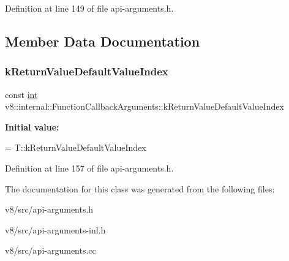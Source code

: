 Definition at line 149 of file api-\/arguments.\+h.



\subsection{Member Data Documentation}
\mbox{\label{classv8_1_1internal_1_1FunctionCallbackArguments_acea5b4f12674359f9dcfd43ab6be7795}} 
\subsubsection{\texorpdfstring{k\+Return\+Value\+Default\+Value\+Index}{kReturnValueDefaultValueIndex}}
{\footnotesize\ttfamily const \mbox{\hyperlink{classint}{int}} v8\+::internal\+::\+Function\+Callback\+Arguments\+::k\+Return\+Value\+Default\+Value\+Index\hspace{0.3cm}{\ttfamily [static]}}

{\bfseries Initial value\+:}
\begin{DoxyCode}
=
      T::kReturnValueDefaultValueIndex
\end{DoxyCode}


Definition at line 157 of file api-\/arguments.\+h.



The documentation for this class was generated from the following files\+:\begin{DoxyCompactItemize}
\item 
v8/src/api-\/arguments.\+h\item 
v8/src/api-\/arguments-\/inl.\+h\item 
v8/src/api-\/arguments.\+cc\end{DoxyCompactItemize}
